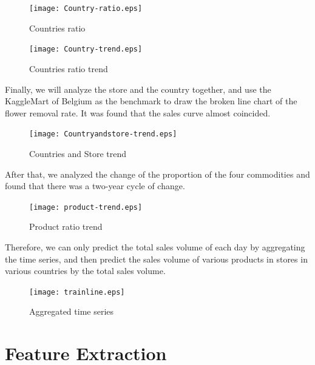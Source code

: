 \begin{figure}[h]
	\centering
	\texttt{[image: Country-ratio.eps]}
	\caption{Countries ratio}\label{fig:OutAspect-target}
\end{figure}
\begin{figure}[h]
	\centering
	\texttt{[image: Country-trend.eps]}
	\caption{Countries ratio trend}\label{fig:OutAspect-target}
\end{figure}

Finally, we will analyze the store and the country together, and use the KaggleMart of Belgium as the benchmark to draw the broken line chart of the flower removal rate. It was found that the sales curve almost coincided.

		\begin{figure}[H]
	\centering
	\texttt{[image: Countryandstore-trend.eps]}
	\caption{Countries and Store trend}\label{fig:OutAspect-target}
	\end{figure}

After that, we analyzed the change of the proportion of the four commodities and found that there was a two-year cycle of change.

		\begin{figure}[H]
	\centering
	\texttt{[image: product-trend.eps]}
	\caption{Product ratio trend}\label{fig:OutAspect-target}
\end{figure}

Therefore, we can only predict the total sales volume of each day by aggregating the time series, and then predict the sales volume of various products in stores in various countries by the total sales volume.

\begin{figure}[h]
	\centering
	\texttt{[image: trainline.eps]}
	\caption{Aggregated time series}\label{fig:OutAspect-target}
\end{figure}

\section{Feature Extraction} \label{sec-method}

